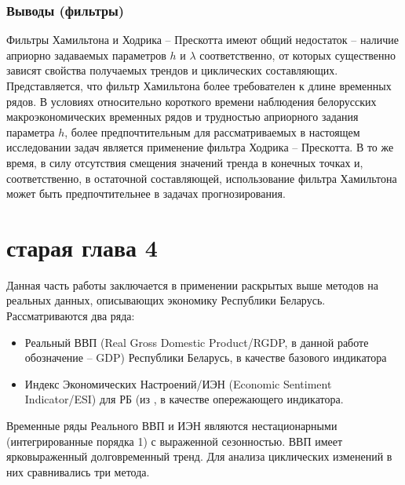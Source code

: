 \documentclass[a4paper,14pt]{extreport}
\begin{document}
	\subsection{Выводы (фильтры)}
	Фильтры Хамильтона и Ходрика – Прескотта  имеют  общий недостаток – наличие априорно задаваемых параметров $h$ и $\lambda$ соответственно, от которых существенно зависят свойства получаемых трендов и циклических составляющих. Представляется, что фильтр Хамильтона более требователен к длине временных рядов.  В условиях относительно короткого времени наблюдения белорусских макроэкономических временных рядов и трудностью априорного задания параметра $h$, более предпочтительным для рассматриваемых в настоящем исследовании задач является применение фильтра Ходрика – Прескотта. В то же время, в силу отсутствия смещения значений тренда в конечных точках и, соответственно, в остаточной составляющей, использование фильтра Хамильтона может быть предпочтительнее в  задачах прогнозирования.
	

	
	\chapter{старая глава 4}
	
	Данная часть работы заключается в применении раскрытых выше методов на реальных данных, описывающих экономику Республики Беларусь. Рассматриваются два ряда: 
	
	\begin{itemize}
		\item Реальный ВВП (Real Gross Domestic Product/RGDP, в данной работе обозначение – GDP) Республики Беларусь, в качестве базового индикатора
		\item Индекс Экономических Настроений/ИЭН (Economic Sentiment Indicator/ESI) для РБ (из \cite{esiMaking,coursework_babakhin,esiExtra}, в качестве опережающего индикатора.
		
	\end{itemize}
	
	Временные ряды Реального ВВП и ИЭН являются нестационарными (интегрированные порядка 1) с выраженной сезонностью. ВВП имеет ярковыраженный долговременный тренд. Для анализа циклических изменений в них сравнивались три метода.
	
\end{document}
